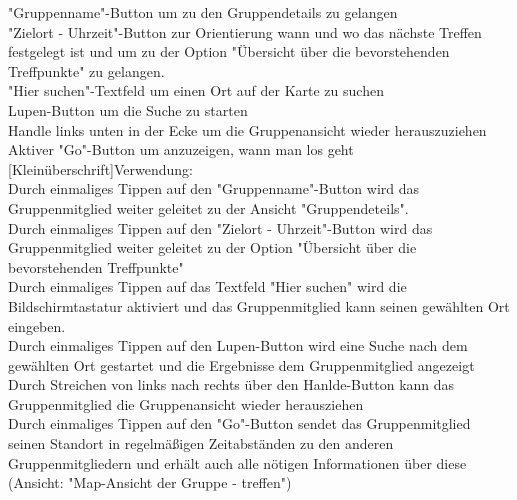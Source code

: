 "Gruppenname"-Button um zu den Gruppendetails zu gelangen\\
"Zielort - Uhrzeit"-Button zur Orientierung wann und wo das nächste Treffen festgelegt ist und um zu der Option "Übersicht über die bevorstehenden Treffpunkte" zu gelangen.\\
"Hier suchen"-Textfeld um einen Ort auf der Karte zu suchen\\
Lupen-Button um die Suche zu starten\\
Handle links unten in der Ecke um die Gruppenansicht wieder herauszuziehen\\
Aktiver "Go"-Button um anzuzeigen, wann man los geht
[Kleinüberschrift]Verwendung:\\
Durch einmaliges Tippen auf den "Gruppenname"-Button wird das Gruppenmitglied weiter geleitet zu der Ansicht "Gruppendeteils".\\
Durch einmaliges Tippen auf den "Zielort - Uhrzeit"-Button wird das Gruppenmitglied weiter geleitet zu der Option "Übersicht über die bevorstehenden Treffpunkte"\\
Durch einmaliges Tippen auf das Textfeld "Hier suchen" wird die Bildschirmtastatur aktiviert und das Gruppenmitglied kann seinen gewählten Ort eingeben.\\
Durch einmaliges Tippen auf den Lupen-Button wird eine Suche nach dem gewählten Ort gestartet und die Ergebnisse dem Gruppenmitglied angezeigt\\
Durch Streichen von links nach rechts über den Hanlde-Button kann das Gruppenmitglied die Gruppenansicht wieder herausziehen\\
Durch einmaliges Tippen auf den "Go"-Button sendet das Gruppenmitglied seinen Standort in regelmäßigen Zeitabständen zu den anderen Gruppenmitgliedern und erhält auch alle nötigen Informationen über diese (Ansicht: "Map-Ansicht der Gruppe - treffen")\\ \\

